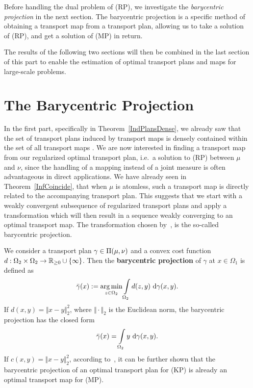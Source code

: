 Before handling the dual problem of (RP), we investigate the \textit{barycentric projection} in the next section. The barycentric projection is a specific method of obtaining a transport map from a transport plan, allowing us to take a solution of (RP), and get a solution of (MP) in return.

The results of the following two sections will then be combined in the last section of this part to enable the estimation of optimal transport plans and maps for large-scale problems.

\section{The Barycentric Projection}\label{BaryProj}

In the first part, specifically in Theorem~\ref{IndPlansDense}, we already saw that the set of transport plans induced by transport maps is densely contained within the set of all transport maps \TP{\mu}{\nu}. We are now interested in finding a transport map from our regularized optimal transport plan, i.e.~a solution to (RP) between $\mu$ and $\nu$, since the handling of a mapping instead of a joint measure is often advantageous in direct applications. We have already seen in Theorem~\ref{InfCoincide}, that when $\mu$ is atomless, such a transport map is directly related to the accompanying transport plan. This suggests that we start with a weakly convergent subsequence of regularized transport plans and apply a transformation which will then result in a sequence weakly converging to an optimal transport map. The transformation chosen by\ \cite{Seg2018}, is the so-called barycentric projection.

\begin{definition}\label{BarCentrProj}
	We consider a transport plan $\gamma \in \TP{\mu}{\nu}$ and a convex cost function $\map[d]{\Omega_2 \times \Omega_2}{\RZero \cup \{ \infty \}}$. Then the \textbf{barycentric projection} of $\gamma$ at $x \in \Omega_1$ is defined as
	\[ \bar{\gamma}(x) := \argmin\limits_{z \in \Omega_2} \int\limits_{\Omega_2} d(z, y)~\Dx[x, y]{\gamma}. \]
	If $d(x, y) = \Vert x - y \Vert_2^2$, where $\Vert \cdot \Vert_2$ is the Euclidean norm, the barycentric projection has the closed form
	\[ \bar{\gamma}(x) = \int\limits_{\Omega_2} y~\Dx[x, y]{\gamma}. \]
	If $c(x, y) = \Vert x - y \Vert_2^2$, according to\ \cite{Seg2018}, it can be further shown that the barycentric projection of an optimal transport plan for (KP) is already an optimal transport map for (MP).
\end{definition}

